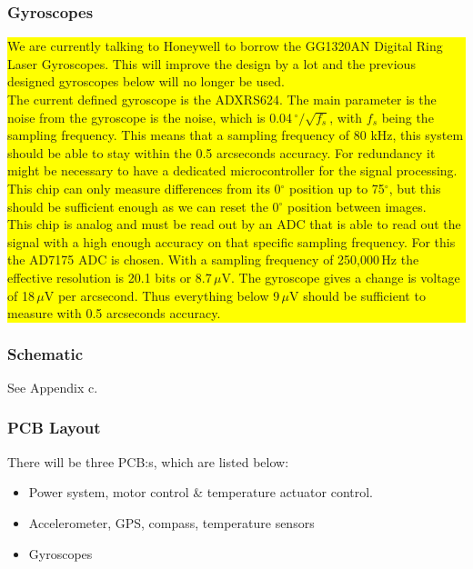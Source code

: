 \subsubsection{Gyroscopes}
\colorbox{yellow}{\parbox{\textwidth}{
We are currently talking to Honeywell to borrow the GG1320AN Digital Ring Laser Gyroscopes. This will improve the design by a lot and the previous designed gyroscopes below will no longer be used.\\

The current defined gyroscope is the ADXRS624. The main parameter is the noise from the gyroscope is the noise, which is 0.04\,$^\circ/ \sqrt{f_s}$, with $f_s$ being the sampling frequency. This means that a sampling frequency of 80 kHz, this system should be able to stay within the 0.5 arcseconds accuracy. For redundancy it might be necessary to have a dedicated microcontroller for the signal processing. This chip can only measure differences from its 0$^\circ$ position up to 75$^\circ$, but this should be sufficient enough as we can reset the 0$^\circ$ position between images.\\

This chip is analog and must be read out by an ADC that is able to read out the signal with a high enough accuracy on that specific sampling frequency. For this the AD7175 ADC is chosen. With a sampling frequency of 250,000\,Hz the effective resolution is 20.1 bits or 8.7\,$\mu$V. The gyroscope gives a change is voltage of 18\,$\mu$V per arcsecond. Thus everything below 9\,$\mu$V should be sufficient to measure with 0.5 arcseconds accuracy.
}}


\subsubsection{Schematic}
See Appendix c.

\subsubsection{PCB Layout}
There will be three PCB:s, which are listed below:

\begin{itemize}
	\item 	Power system, motor control \& temperature actuator control.
	\item	Accelerometer, GPS, compass, temperature sensors
	\item 	Gyroscopes
\end{itemize}



